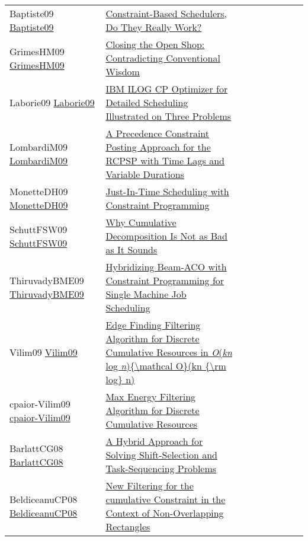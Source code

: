 {\begin{longtable}{p{3cm}p{7cm}lllllll}
Baptiste09 \href{https://doi.org/10.1007/978-3-642-04244-7\_1}{Baptiste09} &  \href{papers/Baptiste09.pdf}{Constraint-Based Schedulers, Do They Really Work?} &  &  &  &  &  &  & \\
GrimesHM09 \href{https://doi.org/10.1007/978-3-642-04244-7\_33}{GrimesHM09} &  \href{papers/GrimesHM09.pdf}{Closing the Open Shop: Contradicting Conventional Wisdom} &  &  &  &  &  &  & \\
Laborie09 \href{https://doi.org/10.1007/978-3-642-01929-6\_12}{Laborie09} &  \href{papers/Laborie09.pdf}{{IBM} {ILOG} {CP} Optimizer for Detailed Scheduling Illustrated on Three Problems} &  &  &  &  &  &  & \\
LombardiM09 \href{https://doi.org/10.1007/978-3-642-04244-7\_45}{LombardiM09} &  \href{papers/LombardiM09.pdf}{A Precedence Constraint Posting Approach for the {RCPSP} with Time Lags and Variable Durations} &  &  &  &  &  &  & \\
MonetteDH09 \href{http://aaai.org/ocs/index.php/ICAPS/ICAPS09/paper/view/712}{MonetteDH09} &  \href{papers/MonetteDH09.pdf}{Just-In-Time Scheduling with Constraint Programming} &  &  &  &  &  &  & \\
SchuttFSW09 \href{https://doi.org/10.1007/978-3-642-04244-7\_58}{SchuttFSW09} &  \href{papers/SchuttFSW09.pdf}{Why Cumulative Decomposition Is Not as Bad as It Sounds} &  &  &  &  &  &  & \\
ThiruvadyBME09 \href{https://doi.org/10.1007/978-3-642-04918-7\_3}{ThiruvadyBME09} &  \href{papers/ThiruvadyBME09.pdf}{Hybridizing Beam-ACO with Constraint Programming for Single Machine Job Scheduling} &  &  &  &  &  &  & \\
Vilim09 \href{https://doi.org/10.1007/978-3-642-04244-7\_62}{Vilim09} &  \href{papers/Vilim09.pdf}{Edge Finding Filtering Algorithm for Discrete Cumulative Resources in \emph{O}(\emph{kn} log \emph{n})\{{\textbackslash}mathcal O\}(kn \{{\textbackslash}rm log\} n)} &  &  &  &  &  &  & \\
cpaior-Vilim09 \href{https://doi.org/10.1007/978-3-642-01929-6\_22}{cpaior-Vilim09} &  \href{papers/cpaior-Vilim09.pdf}{Max Energy Filtering Algorithm for Discrete Cumulative Resources} &  &  &  &  &  &  & \\
BarlattCG08 \href{https://doi.org/10.1007/978-3-540-68155-7\_24}{BarlattCG08} &  \href{papers/BarlattCG08.pdf}{A Hybrid Approach for Solving Shift-Selection and Task-Sequencing Problems} &  &  &  &  &  &  & \\
BeldiceanuCP08 \href{https://doi.org/10.1007/978-3-540-68155-7\_5}{BeldiceanuCP08} &  \href{papers/BeldiceanuCP08.pdf}{New Filtering for the cumulative Constraint in the Context of Non-Overlapping Rectangles} &  &  &  &  &  &  & \\

\end{longtable}}
